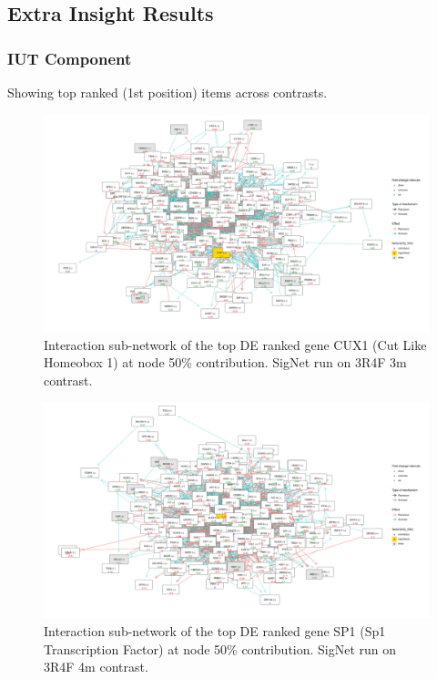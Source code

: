 \subsection{Extra Insight Results}
\label{section:suppl:results}
\subsubsection{IUT Component}
Showing top ranked (1st position) items across contrasts.
\begin{figure}[!htbp]
    \centering
    \includegraphics[width=\textwidth, height=\textheight, keepaspectratio]{Major Thesis/figures/iut/graph/3R4F3m50-CUX1.png}
    \caption{Interaction sub-network of the top DE ranked gene CUX1 (Cut Like Homeobox 1) at node 50\% contribution. SigNet run on 3R4F 3m contrast.}
\end{figure}

\begin{figure}[!htbp]
    \centering
    \includegraphics[width=\textwidth, height=\textheight, keepaspectratio]{Major Thesis/figures/iut/graph/3R4F4m50-SP1.png}
    \caption{Interaction sub-network of the top DE ranked gene SP1 (Sp1 Transcription Factor) at node 50\% contribution. SigNet run on 3R4F 4m contrast.}
\end{figure}

